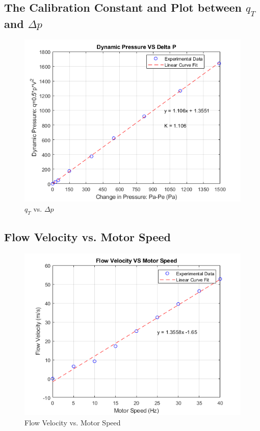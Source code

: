 \documentclass[12pt]{article}
\begin{document}
\subsection{The Calibration Constant and Plot between \(q_T\) and \(\Delta p\)}
    \begin{figure}[h]
        \includegraphics[width=15 cm]{Figure4.png}
        \centering
        \caption{\(q_T\) vs. \(\Delta p\)}
    \end{figure}
\newpage
\subsection{Flow Velocity vs. Motor Speed}
    \begin{figure}[h]
        \includegraphics[width=15 cm]{Figure5.png}
        \centering
        \caption{Flow Velocity vs. Motor Speed}
    \end{figure}
\end{document}
